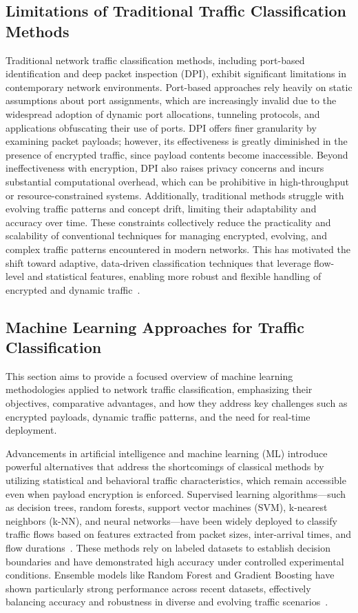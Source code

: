 \documentclass[sigconf]{acmart}
\begin{document}
\subsection{Limitations of Traditional Traffic Classification Methods}

Traditional network traffic classification methods, including port-based identification and deep packet inspection (DPI), exhibit significant limitations in contemporary network environments. Port-based approaches rely heavily on static assumptions about port assignments, which are increasingly invalid due to the widespread adoption of dynamic port allocations, tunneling protocols, and applications obfuscating their use of ports. DPI offers finer granularity by examining packet payloads; however, its effectiveness is greatly diminished in the presence of encrypted traffic, since payload contents become inaccessible. Beyond ineffectiveness with encryption, DPI also raises privacy concerns and incurs substantial computational overhead, which can be prohibitive in high-throughput or resource-constrained systems. Additionally, traditional methods struggle with evolving traffic patterns and concept drift, limiting their adaptability and accuracy over time. These constraints collectively reduce the practicality and scalability of conventional techniques for managing encrypted, evolving, and complex traffic patterns encountered in modern networks. This has motivated the shift toward adaptive, data-driven classification techniques that leverage flow-level and statistical features, enabling more robust and flexible handling of encrypted and dynamic traffic~\cite{ref51}.

\subsection{Machine Learning Approaches for Traffic Classification}

This section aims to provide a focused overview of machine learning methodologies applied to network traffic classification, emphasizing their objectives, comparative advantages, and how they address key challenges such as encrypted payloads, dynamic traffic patterns, and the need for real-time deployment.

Advancements in artificial intelligence and machine learning (ML) introduce powerful alternatives that address the shortcomings of classical methods by utilizing statistical and behavioral traffic characteristics, which remain accessible even when payload encryption is enforced. Supervised learning algorithms—such as decision trees, random forests, support vector machines (SVM), k-nearest neighbors (k-NN), and neural networks—have been widely deployed to classify traffic flows based on features extracted from packet sizes, inter-arrival times, and flow durations~\cite{ref51}. These methods rely on labeled datasets to establish decision boundaries and have demonstrated high accuracy under controlled experimental conditions. Ensemble models like Random Forest and Gradient Boosting have shown particularly strong performance across recent datasets, effectively balancing accuracy and robustness in diverse and evolving traffic scenarios~\cite{ref51}.
\end{document}
